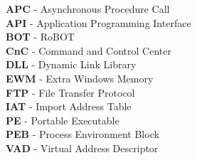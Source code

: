 \textbf{APC} - Asynchronous Procedure Call \\
\textbf{API} - Application Programming Interface \\
\textbf{BOT} - RoBOT \\
\textbf{CnC} - Command and Control Center \\
\textbf{DLL} - Dynamic Link Library \\
\textbf{EWM} - Extra Windows Memory \\
\textbf{FTP} - File Transfer Protocol \\
\textbf{IAT} - Import Address Table \\
\textbf{PE}	 - Portable Executable \\
\textbf{PEB} - Process Environment Block \\
\textbf{VAD} - Virtual Address Descriptor \\